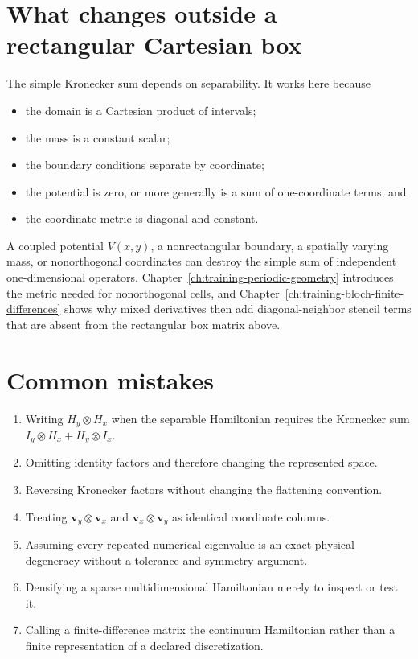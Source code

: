 \section{What changes outside a rectangular Cartesian box}

The simple Kronecker sum depends on separability. It works here because

\begin{itemize}
  \item the domain is a Cartesian product of intervals;
  \item the mass is a constant scalar;
  \item the boundary conditions separate by coordinate;
  \item the potential is zero, or more generally is a sum of one-coordinate
        terms; and
  \item the coordinate metric is diagonal and constant.
\end{itemize}

A coupled potential \(V(x,y)\), a nonrectangular boundary, a spatially varying
mass, or nonorthogonal coordinates can destroy the simple sum of independent
one-dimensional operators. Chapter~\ref{ch:training-periodic-geometry}
introduces the metric needed for nonorthogonal cells, and
Chapter~\ref{ch:training-bloch-finite-differences} shows why mixed derivatives
then add diagonal-neighbor stencil terms that are absent from the rectangular
box matrix above.

\section{Common mistakes}

\begin{enumerate}
  \item Writing \(H_y\otimes H_x\) when the separable Hamiltonian requires the
        Kronecker sum \(I_y\otimes H_x+H_y\otimes I_x\).
  \item Omitting identity factors and therefore changing the represented space.
  \item Reversing Kronecker factors without changing the flattening convention.
  \item Treating \(\mathbf v_y\otimes\mathbf v_x\) and
        \(\mathbf v_x\otimes\mathbf v_y\) as identical coordinate columns.
  \item Assuming every repeated numerical eigenvalue is an exact physical
        degeneracy without a tolerance and symmetry argument.
  \item Densifying a sparse multidimensional Hamiltonian merely to inspect or
        test it.
  \item Calling a finite-difference matrix the continuum Hamiltonian rather
        than a finite representation of a declared discretization.
\end{enumerate}

